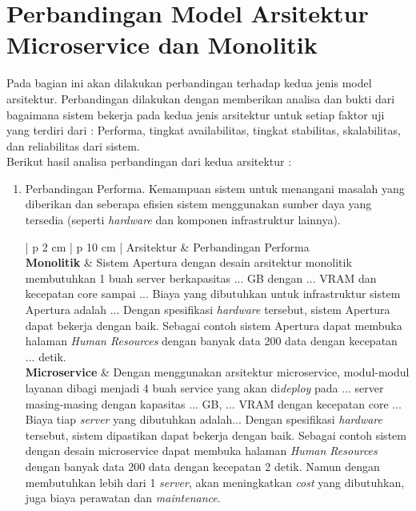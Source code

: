 \section{Perbandingan Model Arsitektur Microservice dan Monolitik}
Pada bagian ini akan dilakukan perbandingan terhadap kedua jenis model arsitektur. Perbandingan dilakukan dengan memberikan analisa dan bukti dari bagaimana sistem bekerja pada kedua jenis arsitektur untuk setiap faktor uji yang terdiri dari : Performa, tingkat availabilitas, tingkat stabilitas, skalabilitas, dan reliabilitas dari sistem.\\
Berikut hasil analisa perbandingan dari kedua arsitektur :
\begin{enumerate}[leftmargin=*]
	\item Perbandingan Performa. Kemampuan sistem untuk menangani masalah yang diberikan dan seberapa efisien sistem menggunakan sumber daya yang tersedia (seperti \textit{hardware} dan komponen infrastruktur lainnya). 
	\begin{table}[H]
		\small
		\begin{adjustbox}{width=1\textwidth}
			\begin{tabular}{| p {2 cm} | p {10 cm} |}
				\hline
				Arsitektur & Perbandingan Performa\\
				\hline
				\textbf{Monolitik} & Sistem Apertura dengan desain arsitektur monolitik membutuhkan 1 buah server berkapasitas ... GB dengan ... VRAM dan kecepatan core sampai ... Biaya yang dibutuhkan untuk infrastruktur sistem Apertura adalah ... Dengan spesifikasi \textit{hardware} tersebut, sistem Apertura dapat bekerja dengan baik. Sebagai contoh sistem Apertura dapat membuka halaman \textit{Human Resources} dengan banyak data 200 data dengan kecepatan ... detik.\\
				\hline
				\textbf{Microservice} & Dengan menggunakan arsitektur microservice, modul-modul layanan dibagi menjadi 4 buah service yang akan di\textit{deploy} pada ... server masing-masing dengan kapasitas ... GB, ... VRAM dengan kecepatan core ... Biaya tiap \textit{server} yang dibutuhkan adalah... Dengan spesifikasi \textit{hardware} tersebut, sistem dipastikan dapat bekerja dengan baik. Sebagai contoh sistem dengan desain microservice dapat membuka halaman \textit{Human Resources} dengan banyak data 200 data dengan kecepatan 2 detik. Namun dengan membutuhkan lebih dari 1 \textit{server}, akan meningkatkan \textit{cost} yang dibutuhkan, juga biaya perawatan dan \textit{maintenance}.\\
				\hline
			\end{tabular}

\end{adjustbox}
\end{table}
\end{enumerate}
